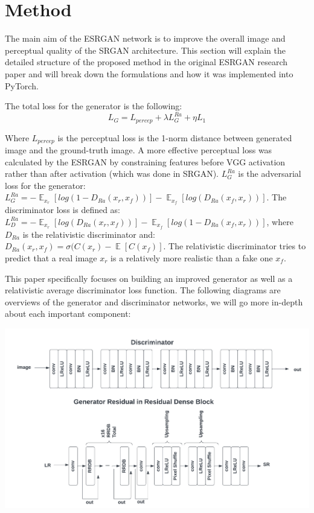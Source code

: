 \documentclass{article}
\begin{document}
\section{Method}
The main aim of the ESRGAN network is to improve the overall image and perceptual quality of the SRGAN architecture. This section will explain the detailed structure of the proposed method in the original ESRGAN research paper and will break down the formulations and how it was implemented into PyTorch.

The total loss for the generator is the following:
\[ L_G = L_{percep} + \lambda L_G^{Ra} + \eta L_1 \]

Where \(L_{percep}\) is the perceptual loss is the 1-norm distance between generated image and the ground-truth image. A more effective perceptual loss was calculated by the ESRGAN by constraining features before VGG activation rather than after activation (which was done in SRGAN). \(L_G^{Ra}\) is the adversarial loss for the generator: \(L_G^{Ra} = -\mathop{{}\mathbb{E}}_{x_r}[log(1 - D_{Ra}(x_r, x_f))] - \mathop{{}\mathbb{E}}_{x_f}[log(D_{Ra}(x_f, x_r))]\). The discriminator loss is defined as: \(L_D^{Ra} = -\mathop{{}\mathbb{E}}_{x_r}[log(D_{Ra}(x_r, x_f))] - \mathop{{}\mathbb{E}}_{x_f}[log(1 - D_{Ra}(x_f, x_r))]\), where \(D_{Ra}\) is the relativistic discriminator and: \(D_{Ra}(x_r, x_f) = \sigma (C(x_r) - \mathop{{}\mathbb{E}}[C(x_f)]\). The relativistic discriminator tries to predict that a real image \(x_r\) is a relatively more realistic than a fake one \(x_f\).

This paper specifically focuses on building an improved generator as well as a relativistic average discriminator loss function. The following diagrams are overviews of the generator and discriminator networks, we will go more in-depth about each important component:

\begin{center}
\includegraphics[scale=0.4]{images/discriminator_and_generator.png}
\end{center}
\end{document}
